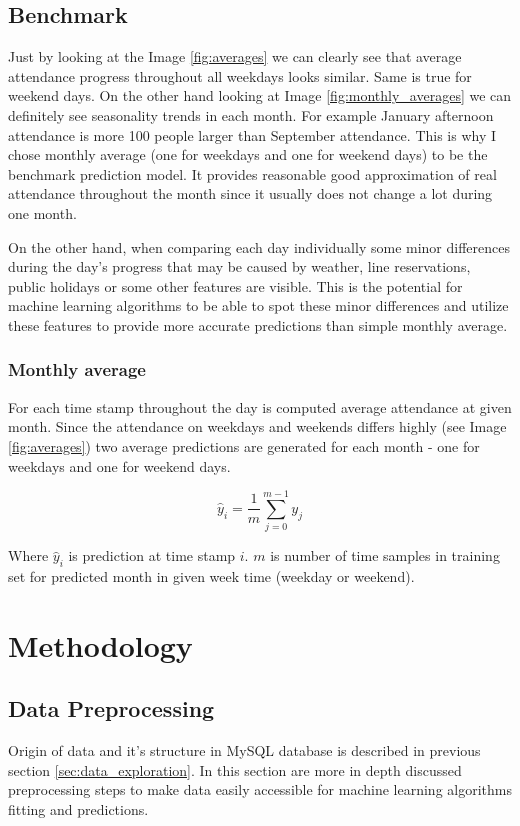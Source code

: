 \documentclass{article}
\begin{document}
\subsection{Benchmark}
Just by looking at the Image \ref{fig:averages} we can clearly see that average attendance progress throughout all weekdays looks similar. Same is true for weekend days. On the other hand looking at Image \ref{fig:monthly_averages} we can definitely see seasonality trends in each month. For example January afternoon attendance is more 100 people larger than September attendance. This is why I chose monthly average (one for weekdays and one for weekend days) to be the benchmark prediction model. It provides reasonable good approximation of real attendance throughout the month since it usually does not change a lot during one month. 

On the other hand, when comparing each day individually some minor differences during the day's progress that may be caused by weather, line reservations, public holidays or some other features are visible. This is the potential for machine learning algorithms to be able to spot these minor differences and utilize these features to provide more accurate predictions than simple monthly average.

\subsubsection{Monthly average} \label{sec:monthly_average}
For each time stamp throughout the day is computed average attendance at given month. Since the attendance on weekdays and weekends differs highly (see Image \ref{fig:averages}) two average predictions are generated for each month - one for weekdays and one for weekend days. 

\begin{equation}
\label{eq:monthly_avg}
\hat{y}_i = \dfrac{1}{m} \sum^{m-1}_{j=0}y_j
\end{equation}

Where $\hat{y}_i$ is prediction at time stamp $i$. $m$ is number of time samples in training set for predicted month in given week time (weekday or weekend).

\section{Methodology}
\subsection{Data Preprocessing} \label{sec:data_preprocessing}
Origin of data and it's structure in MySQL database is described in previous section \ref{sec:data_exploration}. In this section are more in depth discussed preprocessing steps to make data easily accessible for machine learning algorithms fitting and predictions.
\end{document}
